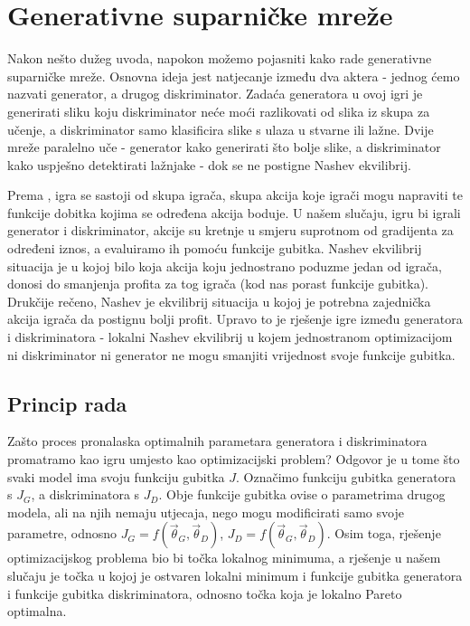 \section{Generativne suparničke mreže}
Nakon nešto dužeg uvoda, napokon možemo pojasniti kako rade generativne suparničke mreže. Osnovna ideja jest natjecanje između dva aktera - jednog ćemo nazvati generator, a drugog diskriminator. Zadaća generatora u ovoj igri je generirati sliku koju diskriminator neće moći razlikovati od slika iz skupa za učenje, a diskriminator samo klasificira slike s ulaza u stvarne ili lažne. Dvije mreže paralelno uče - generator kako generirati što bolje slike, a diskriminator kako uspješno detektirati lažnjake - dok se ne postigne Nashev ekvilibrij.

Prema \citep{nash_eq}, igra se sastoji od skupa igrača, skupa akcija koje igrači mogu napraviti te funkcije dobitka kojima se određena akcija boduje. U našem slučaju, igru bi igrali generator i diskriminator, akcije su kretnje u smjeru suprotnom od gradijenta za određeni iznos, a evaluiramo ih pomoću funkcije gubitka. Nashev ekvilibrij \citep{nash1950equilibrium} situacija je u kojoj bilo koja akcija koju jednostrano poduzme jedan od igrača, donosi do smanjenja profita za tog igrača (kod nas porast funkcije gubitka). Drukčije rečeno, Nashev je ekvilibrij situacija u kojoj je potrebna zajednička akcija igrača da postignu bolji profit. Upravo to je rješenje igre između generatora i diskriminatora - lokalni Nashev ekvilibrij \citep{heusel2017gans} u kojem jednostranom optimizacijom ni diskriminator ni generator ne mogu smanjiti vrijednost svoje funkcije gubitka.

\subsection{Princip rada}
Zašto proces pronalaska optimalnih parametara generatora i diskriminatora promatramo kao igru umjesto kao optimizacijski problem? Odgovor je u tome što svaki model ima svoju funkciju gubitka $J$. Označimo funkciju gubitka generatora s $J_G$, a diskriminatora s $J_D$. Obje funkcije gubitka ovise o parametrima drugog modela, ali na njih nemaju utjecaja, nego mogu modificirati samo svoje parametre, odnosno
$J_G = f(\vec{\theta}_G, \vec{\theta}_D)$, $J_D =  f(\vec{\theta}_G, \vec{\theta}_D)$. Osim toga, rješenje optimizacijskog problema bio bi točka lokalnog minimuma, a rješenje u našem slučaju je točka u kojoj je ostvaren lokalni minimum i funkcije gubitka generatora i funkcije gubitka diskriminatora, odnosno točka koja je lokalno Pareto optimalna.

